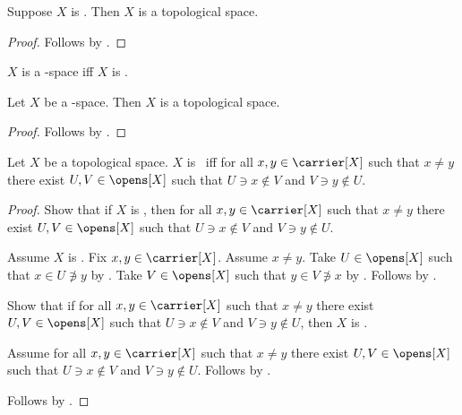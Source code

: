 \begin{classification}\label{teeone_is_topological}
    Suppose $X$ is \teeone.
    Then $X$ is a topological space.
\end{classification}
\begin{proof}
    Follows by .
\end{proof}

\begin{abbreviation}\label{teeone_space}
    $X$ is a \teeone-space iff $X$ is \teeone.
\end{abbreviation}

\begin{classification}\label{teeone_space_is_topological}
    Let $X$ be a \teeone-space.
    Then $X$ is a topological space.
\end{classification}
\begin{proof}
    Follows by .
\end{proof}

\begin{proposition}\label{teeone_iff_two_open_neighbourhoods}
    Let $X$ be a topological space.
    $X$ is \teeone\ iff for all $x,y\in\carrier[X]$ such that
        $x\neq y$ there exist $U,V\in\opens[X]$ such that
        $U\ni x\notin V$ and $V\ni y\notin U$.
\end{proposition}
\begin{proof}
    Show that if $X$ is \teeone, then for all
        $x,y\in\carrier[X]$ such that $x\neq y$
        there exist $U,V\in\opens[X]$ such that
        $U\ni x\notin V$ and $V\ni y\notin U$.
    \begin{subproof}
        Assume $X$ is \teeone.
        Fix $x,y\in\carrier[X]$.
        Assume $x\neq y$.
        Take $U\in\opens[X]$ such that $x\in U\not\ni y$
            by .
        Take $V\in\opens[X]$ such that $y\in V\not\ni x$
            by .
        Follows by \auto.
    \end{subproof}

    Show that if for all $x,y\in\carrier[X]$ such that $x\neq y$
        there exist $U,V\in\opens[X]$ such that
        $U\ni x\notin V$ and $V\ni y\notin U$, then $X$ is \teeone.
    \begin{subproof}
        Assume for all $x,y\in\carrier[X]$ such that $x\neq y$
            there exist $U,V\in\opens[X]$ such that
            $U\ni x\notin V$ and $V\ni y\notin U$.
        Follows by .
    \end{subproof}
    Follows by \auto.
\end{proof}

